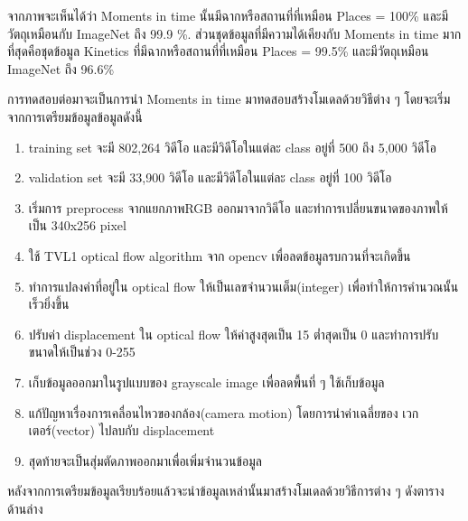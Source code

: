 จากภาพจะเห็นได้ว่า Moments in time นั้นมีฉากหรือสถานที่ที่เหมือน Places = 100\% และมีวัตถุเหมือนกับ ImageNet ถึง 99.9 \%. ส่วนชุดข้อมูลที่มีความได้เคียงกับ Moments in time มากที่สุดคือชุดข้อมูล Kinetics ที่มีฉากหรือสถานที่ที่เหมือน Places = 99.5\% และมีวัตถุเหมือน ImageNet ถึง 96.6\%
\par
การทดสอบต่อมาจะเป็นการนำ Moments in time มาทดสอบสร้างโมเดลด้วยวิธีต่าง ๆ โดยจะเริ่มจากการเตรียมข้อมูลข้อมูลดังนี้
\begin{enumerate}
	\setlength\itemsep{-0.25em}
	\item training set จะมี 802,264 วิดีโอ และมีวิดีโอในแต่ละ class อยู่ที่ 500 ถึง 5,000 วิดีโอ
	\item validation set จะมี 33,900 วิดีโอ และมีวิดีโอในแต่ละ class อยู่ที่ 100 วิดีโอ
	\item เริ่มการ preprocess จากแยกภาพRGB ออกมาจากวิดีโอ และทำการเปลี่ยนขนาดของภาพให้เป็น 340x256  pixel
	\item ใช้ TVL1 optical flow algorithm จาก opencv เพื่อลดข้อมูลรบกวนที่จะเกิดขึ้น
	\item ทำการแปลงค่าที่อยู่ใน optical flow ให้เป็นเลขจำนวนเต็ม(integer) เพื่อทำให้การคำนวณนั้นเร็วยิ่งขึ้น
	\item ปรับค่า displacement ใน optical flow ให้ค่าสูงสุดเป็น 15 ต่ำสุดเป็น 0 และทำการปรับขนาดให้เป็นช่วง 0-255
	\item เก็บข้อมูลออกมาในรูปแบบของ grayscale image เพื่อลดพื้นที่ ๆ ใช้เก็บข้อมูล
	\item แก้ปัญหาเรื่องการเคลื่อนไหวของกล้อง(camera motion) โดยการนำค่าเฉลี่ยของ เวกเตอร์(vector) ไปลบกับ displacement
	\item สุดท้ายจะเป็นสุ่มตัดภาพออกมาเพื่อเพิ่มจำนวนข้อมูล
\end{enumerate}
หลังจากการเตรียมข้อมูลเรียบร้อยแล้วจะนำข้อมูลเหล่านั้นมาสร้างโมเดลด้วยวิธีการต่าง ๆ ดังตารางด้านล่าง

